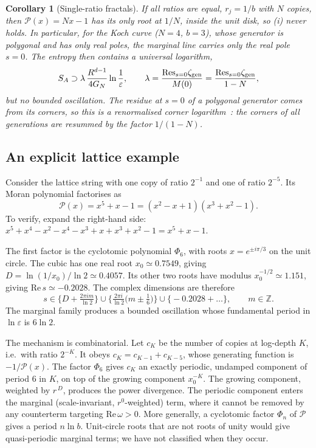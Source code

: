 \documentclass[11pt]{article}
\newtheorem{corollary}{Corollary}[section]
\theoremstyle{definition}\newtheorem{definition}{Definition}[section]
\theoremstyle{remark}\newtheorem*{remark}{Remark}
\newcommand{\ZZ}{\mathbb{Z}}
\newcommand{\GN}{G_N}
\begin{document}
\begin{corollary}[Single-ratio fractals]
\label{cor:koch}
If all ratios are equal, $r_j=1/b$ with $N$ copies, then $\mathcal P(x)=Nx-1$ has its only root at $1/N$,
inside the unit disk, so (i) never holds. In particular, for the Koch curve ($N=4$, $b=3$), whose generator is
polygonal and has only real poles, the marginal line carries only the real pole $s=0$. The entropy then
contains a universal logarithm,
\begin{equation}
S_A\supset\lambda\,\frac{R^{d-1}}{4\GN}\ln\frac1\varepsilon,\qquad
\lambda=\frac{\mathrm{Res}_{s=0}\zeta_{\rm gen}}{M(0)}=\frac{\mathrm{Res}_{s=0}\zeta_{\rm gen}}{1-N},
\end{equation}
but no bounded oscillation. The residue at $s=0$ of a polygonal generator comes from its corners, so this
is a renormalised corner logarithm~\cite{HirataTakayanagi}: the corners of all generations are resummed by the
factor $1/(1-N)$.
\end{corollary}

\subsection{An explicit lattice example}
Consider the lattice string with one copy of ratio $2^{-1}$ and one of ratio $2^{-5}$. Its Moran polynomial
factorises as
\begin{equation}
\mathcal P(x)=x^5+x-1=(x^2-x+1)(x^3+x^2-1).
\end{equation}
To verify, expand the right-hand side:
$x^5+x^4-x^2-x^4-x^3+x+x^3+x^2-1=x^5+x-1$.

The first factor is the cyclotomic polynomial $\Phi_6$, with roots $x=e^{\pm i\pi/3}$ on the unit circle.
The cubic has one real root $x_0\simeq0.7549$, giving $D=\ln(1/x_0)/\ln2\simeq0.4057$. Its other two roots
have modulus $x_0^{-1/2}\simeq1.151$, giving $\mathrm{Re}\,s\simeq-0.2028$. The complex dimensions are therefore
\begin{equation}
s\in\Big\{D+\tfrac{2\pi i m}{\ln2}\Big\}\cup\Big\{\tfrac{2\pi i}{\ln2}\big(m\pm\tfrac16\big)\Big\}
\cup\Big\{-0.2028+\dots\Big\},\qquad m\in\ZZ .
\end{equation}
The marginal family produces a bounded oscillation whose fundamental period in $\ln\varepsilon$ is $6\ln2$.

The mechanism is combinatorial. Let $c_K$ be the number of copies at log-depth $K$, i.e.\ with ratio
$2^{-K}$. It obeys $c_K=c_{K-1}+c_{K-5}$, whose generating function is $-1/\mathcal P(x)$. The factor $\Phi_6$
gives $c_K$ an exactly periodic, undamped component of period $6$ in $K$, on top of the growing component
$x_0^{-K}$. The growing component, weighted by $r^{\,D}$, produces the power divergence. The periodic component
enters the marginal (scale-invariant, $r^0$-weighted) term, where it cannot be removed by any counterterm
targeting $\mathrm{Re}\,\omega>0$. More generally, a cyclotomic factor $\Phi_n$ of $\mathcal P$ gives a period
$n\ln b$. Unit-circle roots that are not roots of unity would give quasi-periodic marginal terms; we have not
classified when they occur.
\end{document}
